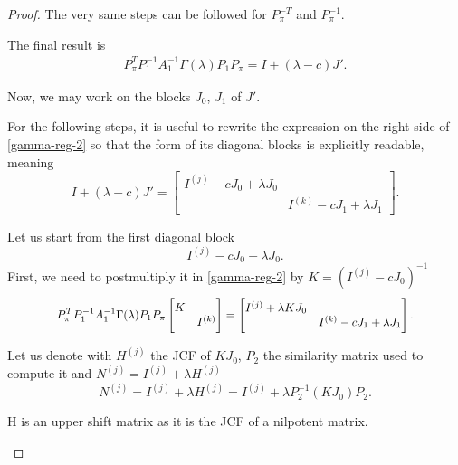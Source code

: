 \begin{proof}
    The very same steps can be followed for \(P_{\pi}^{-T}\) and \(P_{\pi}^{-1}\).

    The final result is
    \begin{gather}
        P_{\pi}^T P_{1}^{-1} A_{1}^{-1} \Gamma(\lambda) P_{1} P_{\pi} = I + (\lambda - c)J'. \label{gamma-reg-2}
    \end{gather}

    Now, we may work on the blocks \(J_{0}\), \(J_{1}\) of \(J'\).

    For the following steps, it is useful to rewrite the expression on the right side of \eqref{gamma-reg-2} so that
    the form of its diagonal blocks is explicitly readable, meaning
    \[
        I + (\lambda - c)J' =
        \begin{bmatrix}
            I^{(j)} - cJ_{0} + \lambda J_{0} & \\
            & I^{(k)} - cJ_{1} + \lambda J_{1}
        \end{bmatrix}.
    \]

    Let us start from the first diagonal block
    \[
        I^{(j)} - cJ_{0} + \lambda J_{0}.
    \]
    First, we need to postmultiply it in
    \eqref{gamma-reg-2} by \(K = (I^{(j)} - cJ_{0})^{-1}\)
    \begin{gather*}
        \scalemath{0.92}{
            P_{\pi}^T P_{1}^{-1} A_{1}^{-1} \Gamma(\lambda) P_{1} P_{\pi}
            \begin{bmatrix}
                K& \\
                & I^{(k)}
            \end{bmatrix}
            = 
            \begin{bmatrix}
                I^{(j)} + \lambda K J_{0} & \\
                & I^{(k)} - cJ_{1} + \lambda J_{1}
            \end{bmatrix}.
        }
    \end{gather*}

    Let us denote with \(H^{(j)}\) the JCF of \(K J_{0}\), \(P_{2}\) the similarity matrix
    used to compute it and \(N^{(j)} = I^{(j)} + \lambda H^{(j)}\)
    \[
        N^{(j)} = I^{(j)} + \lambda H^{(j)} = I^{(j)} + \lambda P_{2}^{-1} (K J_{0}) P_{2}.
    \]

    \begin{remark}
        H is an upper shift matrix as it is the JCF of a nilpotent matrix.
    \end{remark}


\end{proof}
